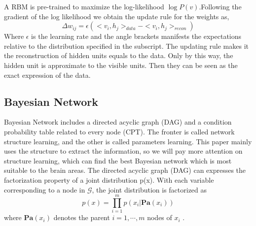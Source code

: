 \documentclass[10pt,twocolumn,letterpaper]{article}
\begin{document}
A RBM is pre-trained to maximize the log-likelihood $\log P(v)$.Following the gradient of the log likelihood we obtain the update rule for the weights as,
\begin{equation}
\Delta w_{ij} = \epsilon (<v_i,h_j>_{data} - <v_i,h_j>_{recon})
\end{equation}
Where $\epsilon$ is the learning rate and the angle brackets manifests the expectations relative to the distribution specified in the subscript. The updating rule makes it the reconstruction of hidden units equals to the data. Only by this way, the hidden unit is approximate to the visible units. Then they can be seen as the exact expression of the data.



\subsection{Bayesian Network}
Bayesian Network includes a directed acyclic graph (DAG) and a condition probability table related to every node (CPT). The fronter is called network structure learning, and the other is called parameters learning. This paper mainly uses the structure to extract the information, so we will pay more attention on structure learning, which can find the best Bayesian network which is most suitable to the brain areas.
The directed acyclic graph (DAG) can expresses the factorization property of a joint distribution p(x). With each variable corresponding to a node in $\mathcal{G}$, the joint distribution is factorized as 
\begin{equation}
p(x) =\prod_{i=1}^m p(x_i |\boldsymbol{Pa}(x_i))
\end{equation}
where $\boldsymbol{Pa}(x_i)$ denotes the parent $i=1,\cdots,m$ nodes of $x_i$ .
\end{document}
